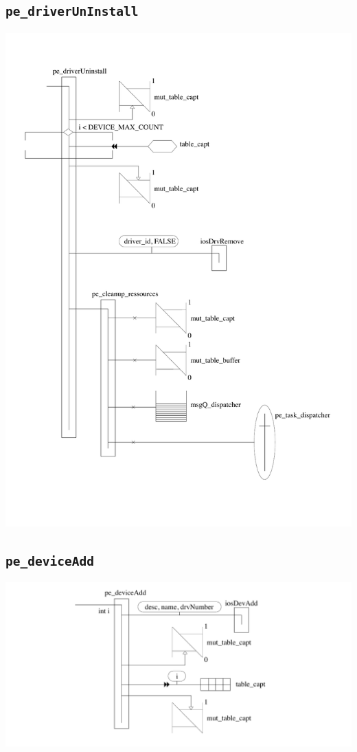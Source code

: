 \documentclass[11pt, a4paper]{article}
\newcommand{\kw}[1]{\texttt{#1}}
\begin{document}
\subsection{\kw{pe\_driverUnInstall}}
\includegraphics[width=\textwidth]{ressources/pe_driverUninstall.pdf}
\subsection{\kw{pe\_deviceAdd}}
\includegraphics[width=\textwidth]{ressources/pe_deviceAdd.pdf}
\end{document}

